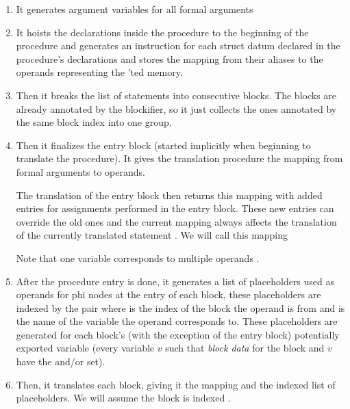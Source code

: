 \begin{enumerate}
    \item It generates argument variables for all formal arguments

    \item It hoists the declarations inside the procedure to the beginning of the procedure and generates an  instruction for each struct datum declared in the procedure's  declarations and stores the mapping from their aliases to the operands representing the 'ted memory.

    \item Then it breaks the list of statements into consecutive blocks. The blocks are already annotated by the blockifier, so it just collects the ones annotated by the same block index into one group.

    \item Then it finalizes the entry block (started implicitly when beginning to translate the procedure). It gives the translation procedure the mapping from formal arguments to operands.


    The translation of the entry block then returns this mapping with added entries for assignments performed in the entry block. These new entries can override the old ones and the current mapping always affects the translation of the currently translated statement . We will call this mapping 

    Note that one variable corresponds to multiple operands . 

    \item After the procedure entry is done, it generates a list  of placeholders used as operands for phi nodes at the entry of each block, these placeholders are indexed by the pair  where  is the index of the block the operand is from and  is the name of the variable the operand corresponds to. These placeholders are generated for each block's (with the exception of the entry block) potentially exported variable (every variable $v$ such that \emph{block data} for the block and $v$ have the  and/or  set).

    \item Then, it translates each block, giving it the  mapping and the indexed list of placeholders. We will assume the block is indexed .


\end{enumerate}
